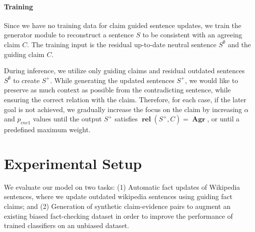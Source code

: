 \documentclass[letterpaper]{article} %
\DeclareMathOperator{\rel}{\boldsymbol{rel}}
\DeclareMathOperator{\A}{\boldsymbol{Agr}}
\begin{document}
\paragraph{Training} 

Since we have no training data for claim guided sentence updates, we train the generator module to reconstruct a sentence $S$ to be consistent with an agreeing claim $C$. The training input is the residual up-to-date neutral sentence $S^{\emptyset}$ and the guiding claim $C$. 

During inference, we utilize only guiding claims and residual outdated sentences $S^{\emptyset}$ to create $S^+$. While generating the updated sentences $S^+$, we would like to preserve as much context as possible from the contradicting sentence, while ensuring the correct relation with the claim. Therefore, for each case, if the later goal is not achieved, we gradually increase the focus on the claim by increasing $\alpha$ and $p_{enc1}$ values until the output $S^+$ satisfies $\rel(S^+,C)=\A$, or until a predefined maximum weight.



\section{Experimental Setup}
\label{sec:experiments}
We evaluate our model on two tasks: (1) Automatic fact updates of Wikipedia sentences, where we update outdated wikipedia sentences using guiding fact claims; and (2) Generation of synthetic claim-evidence pairs to augment an existing biased fact-checking dataset in order to improve the performance of trained classifiers on an unbiased dataset.
\end{document}
